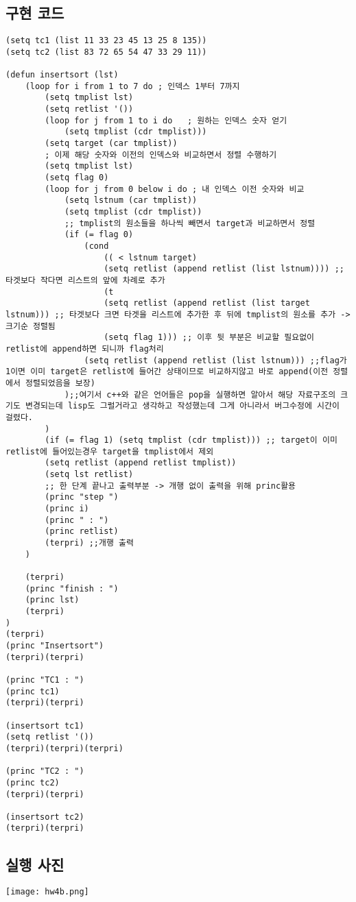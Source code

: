 \documentclass[11pt,oneside,a4paper]{article}
\begin{document}
\subsection{구현 코드}
\begin{verbatim} 
(setq tc1 (list 11 33 23 45 13 25 8 135))
(setq tc2 (list 83 72 65 54 47 33 29 11))

(defun insertsort (lst)
	(loop for i from 1 to 7 do ; 인덱스 1부터 7까지
		(setq tmplist lst)
		(setq retlist '())
		(loop for j from 1 to i do   ; 원하는 인덱스 숫자 얻기
			(setq tmplist (cdr tmplist)))
		(setq target (car tmplist))
		; 이제 해당 숫자와 이전의 인덱스와 비교하면서 정렬 수행하기
		(setq tmplist lst)
		(setq flag 0)
		(loop for j from 0 below i do ; 내 인덱스 이전 숫자와 비교
			(setq lstnum (car tmplist))
			(setq tmplist (cdr tmplist))
			;; tmplist의 원소들을 하나씩 빼면서 target과 비교하면서 정렬
			(if (= flag 0)
				(cond
					(( < lstnum target)
				 	(setq retlist (append retlist (list lstnum)))) ;; 타겟보다 작다면 리스트의 앞에 차례로 추가
					(t
				 	(setq retlist (append retlist (list target lstnum))) ;; 타겟보다 크면 타겟을 리스트에 추가한 후 뒤에 tmplist의 원소를 추가 -> 크기순 정렬됨
				 	(setq flag 1))) ;; 이후 뒷 부분은 비교할 필요없이 retlist에 append하면 되니까 flag처리
				(setq retlist (append retlist (list lstnum))) ;;flag가 1이면 이미 target은 retlist에 들어간 상태이므로 비교하지않고 바로 append(이전 정렬에서 정렬되었음을 보장)
			);;여기서 c++와 같은 언어들은 pop을 실행하면 알아서 해당 자료구조의 크기도 변경되는데 lisp도 그럴거라고 생각하고 작성했는데 그게 아니라서 버그수정에 시간이 걸렸다.
		)
		(if (= flag 1) (setq tmplist (cdr tmplist))) ;; target이 이미 retlist에 들어있는경우 target을 tmplist에서 제외
		(setq retlist (append retlist tmplist))
		(setq lst retlist)
		;; 한 단계 끝나고 출력부분 -> 개행 없이 출력을 위해 princ활용
		(princ "step ")
		(princ i)
		(princ " : ")
		(princ retlist)
		(terpri) ;;개행 출력
	)

	(terpri)
	(princ "finish : ")
	(princ lst)
	(terpri)
)
(terpri)
(princ "Insertsort")
(terpri)(terpri)

(princ "TC1 : ")
(princ tc1)
(terpri)(terpri)

(insertsort tc1)
(setq retlist '())
(terpri)(terpri)(terpri)

(princ "TC2 : ")
(princ tc2)
(terpri)(terpri)

(insertsort tc2)
(terpri)(terpri)

\end{verbatim}
\subsection{실행 사진}
\label{myPicture:pic}
\texttt{[image: hw4b.png]}
\end{document}
